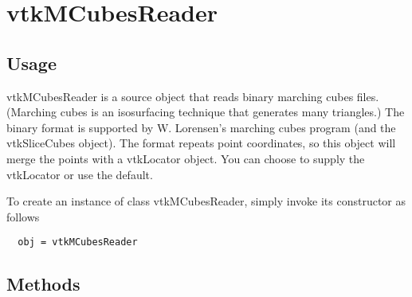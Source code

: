 \section{vtkMCubesReader}

\subsection{Usage}

 vtkMCubesReader is a source object that reads binary marching cubes
 files. (Marching cubes is an isosurfacing technique that generates 
 many triangles.) The binary format is supported by W. Lorensen's
 marching cubes program (and the vtkSliceCubes object). The format 
 repeats point coordinates, so this object will merge the points 
 with a vtkLocator object. You can choose to supply the vtkLocator 
 or use the default.

To create an instance of class vtkMCubesReader, simply
invoke its constructor as follows
\begin{verbatim}
  obj = vtkMCubesReader
\end{verbatim}
\subsection{Methods}

